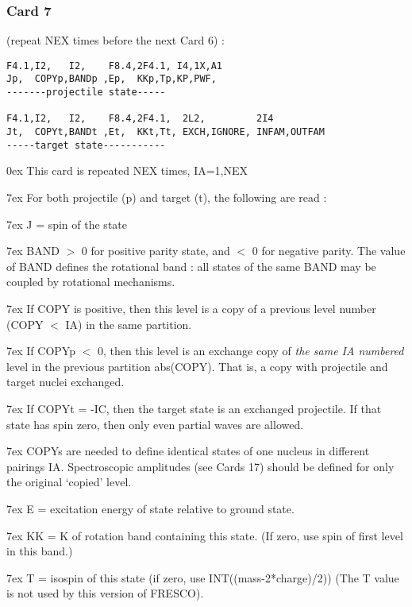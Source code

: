 \documentclass[11pt]{article}
\begin{document}
\subsubsection*{Card 7}
(repeat NEX times before the next Card 6) :
\begin{verbatim}
F4.1,I2,   I2,    F8.4,2F4.1, I4,1X,A1
Jp,  COPYp,BANDp ,Ep,  KKp,Tp,KP,PWF,
-------projectile state-----

F4.1,I2,   I2,    F8.4,2F4.1,  2L2,         2I4
Jt,  COPYt,BANDt ,Et,  KKt,Tt, EXCH,IGNORE, INFAM,OUTFAM
-----target state-----------
\end{verbatim}

\hangindent 0ex
This card is repeated NEX times, IA=1,NEX

\hangindent 7ex
For both projectile (p) and target (t), the following are read :

\hangindent 7ex
J     = spin of the state

\hangindent 7ex
BAND  $>$ 0 for positive parity state, and $<$ 0 for negative parity.
The value of BAND defines the rotational band : all states of the
same BAND may be coupled by rotational mechanisms.

\hangindent 7ex
If COPY is positive, then this level is a copy of a
previous level number (COPY $<$ IA) in the same partition.

\hangindent 7ex
If COPYp $<$ 0, then this level is an exchange copy of
{\em the same IA numbered}
level in the previous partition abs(COPY).
That is, a copy with projectile and target nuclei exchanged.

\hangindent 7ex
If COPYt = -IC, then the target state is an exchanged projectile.
If that state has spin zero, then only even partial waves are allowed.

\hangindent 7ex
COPYs are needed to define identical states of one nucleus in different
pairings IA.   Spectroscopic amplitudes (see Cards 17) should be defined
for only the original `copied' level.

\hangindent 7ex
E     = excitation energy of state relative to ground state.

\hangindent 7ex
KK     = K of rotation band containing this state.
(If zero, use spin of first level in this band.)

\hangindent 7ex
T     = isospin of this state (if zero, use INT((mass-2*charge)/2))
(The T value is not used by this version of FRESCO).
\end{document}
